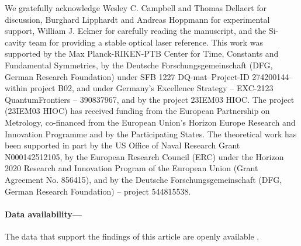 \documentclass[
reprint,
superscriptaddress,









amsmath,amssymb,
aps,prl






]{revtex4-2}
\begin{document}
We gratefully acknowledge Wesley C. Campbell and Thomas Dellaert for discussion, Burghard Lipphardt and Andreas Hoppmann for experimental support, William J. Eckner for carefully reading the manuscript, and the Si-cavity team for providing a stable optical laser reference.  This work was supported by the Max Planck-RIKEN-PTB Center for Time, Constants and Fundamental Symmetries, by the Deutsche Forschungsgemeinschaft (DFG, German Research Foundation) under SFB 1227 DQ-mat–Project-ID 274200144–within project B02, and under Germany’s Excellence Strategy – EXC-2123 QuantumFrontiers – 390837967, and by the project 23IEM03 HIOC. The project (23IEM03 HIOC) has received funding from the European Partnership on Metrology, co-financed from the European Union’s Horizon Europe Research and Innovation Programme and by the Participating States. The theoretical work has been supported in part by the US Office of Naval Research Grant N000142512105, by the European Research Council (ERC) under the Horizon 2020 Research and Innovation Program of the European Union (Grant Agreement No. 856415), and by the Deutsche Forschungsgemeinschaft (DFG, German Research Foundation) -- project 544815538.

\paragraph*{Data availability---}
\hspace{-1.5em} The data that support the findings of this article are openly available \cite{data}.






\nocite{*}
\end{document}
